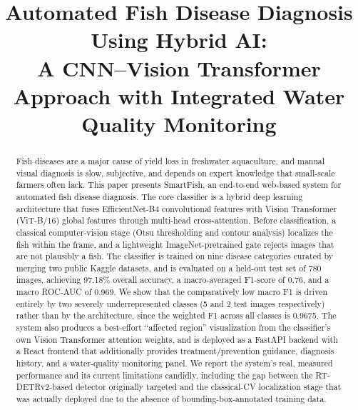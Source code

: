 \documentclass[conference]{IEEEtran}
\begin{document}
\title{Automated Fish Disease Diagnosis Using Hybrid AI:\\
A CNN--Vision Transformer Approach with Integrated Water Quality Monitoring}

\author{
}

\maketitle

\begin{abstract}
Fish diseases are a major cause of yield loss in freshwater aquaculture, and manual visual diagnosis is slow, subjective, and depends on expert knowledge that small-scale farmers often lack. This paper presents SmartFish, an end-to-end web-based system for automated fish disease diagnosis. The core classifier is a hybrid deep learning architecture that fuses EfficientNet-B4 convolutional features with Vision Transformer (ViT-B/16) global features through multi-head cross-attention. Before classification, a classical computer-vision stage (Otsu thresholding and contour analysis) localizes the fish within the frame, and a lightweight ImageNet-pretrained gate rejects images that are not plausibly a fish. The classifier is trained on nine disease categories curated by merging two public Kaggle datasets, and is evaluated on a held-out test set of 780 images, achieving 97.18\% overall accuracy, a macro-averaged F1-score of 0.76, and a macro ROC-AUC of 0.969. We show that the comparatively low macro F1 is driven entirely by two severely underrepresented classes (5 and 2 test images respectively) rather than by the architecture, since the weighted F1 across all classes is 0.9675. The system also produces a best-effort ``affected region'' visualization from the classifier's own Vision Transformer attention weights, and is deployed as a FastAPI backend with a React frontend that additionally provides treatment/prevention guidance, diagnosis history, and a water-quality monitoring panel. We report the system's real, measured performance and its current limitations candidly, including the gap between the RT-DETRv2-based detector originally targeted and the classical-CV localization stage that was actually deployed due to the absence of bounding-box-annotated training data.
\end{abstract}
\end{document}
